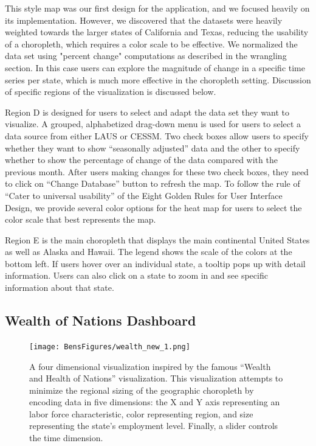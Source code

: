 \documentclass[journal]{IEEEtran}
\begin{document}
{This style map was our first design for the application, and we focused heavily on its implementation. However, we discovered that the datasets were heavily weighted towards the larger states of California and Texas, reducing the usability of a choropleth, which requires a color scale to be effective. We normalized the data set using "percent change" computations as described in the wrangling section. In this case users can explore the magnitude of change in a specific time series per state, which is much more effective in the choropleth setting. Discussion of specific regions of the visualization is discussed below.

Region D is designed for users to select and adapt the data set they want to visualize. A grouped, alphabetized drag-down menu is used for users to select a data source from either LAUS or CESSM. Two check boxes allow users to specify whether they want to show ``seasonally adjusted'' data and the other to specify whether to show the percentage of change of the data compared with the previous month. After users making changes for these two check boxes, they need to click on ``Change Database'' button to refresh the map. To follow the rule of ``Cater to universal usability'' of the Eight Golden Rules for User Interface Design, we provide several color options for the heat map for users to select the color scale that best represents the map.

Region E is the main choropleth that displays the main continental United States as well as Alaska and Hawaii. The legend shows the scale of the colors at the bottom left. If users hover over an individual state, a tooltip pops up with detail information. Users can also click on a state to zoom in and see specific information about that state.

\subsection{Wealth of Nations Dashboard}

\begin{figure}[!ht]
    \centering
    \texttt{[image: BensFigures/wealth\_new\_1.png]}
    \caption{A four dimensional visualization inspired by the famous ``Wealth and Health of Nations'' visualization. This visualization attempts to minimize the regional sizing of the geographic choropleth by encoding data in five dimensions: the X and Y axis representing an labor force characteristic, color representing region, and size representing the state's employment level. Finally, a slider controls the time dimension.}
    \label{fig:wealth}
\end{figure}

}
\end{document}
